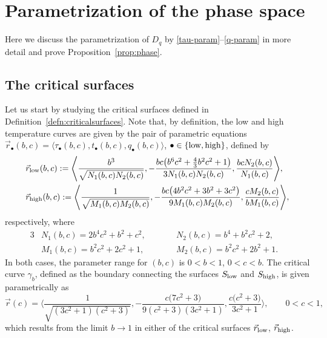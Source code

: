 \documentclass[10pt,a4paper]{amsart}
\numberwithin{equation}{section}
\begin{document}
\section{Parametrization of the phase space} \label{app:param}
Here we discuss the parametrization of $D_q$ by \eqref{tau-param}--\eqref{q-param} in more detail and prove Proposition~\ref{prop:phase}.


\subsection{The critical surfaces}
Let us start by studying the critical surfaces defined in Definition~\ref{defn:criticalsurfaces}.
Note that, by definition, the low and high temperature curves are given by the pair of parametric equations $\vec{r}_{\bullet}(b,c) = \langle \tau_{\bullet}(b,c), t_{\bullet}(b,c), q_{\bullet}(b,c)\rangle$, $\bullet \in \{{\rm low}, {\rm high}\}$, defined by
 \begin{align*}
 &\vec{r}_{{\rm low}}(b,c):= \Biggl\langle \frac{b^3}{\sqrt{N_1(b,c)N_2(b,c)}},-\frac{bc\bigl(b^6c^2 + \frac{4}{3}b^2c^2 + 1\bigr)}{3N_1(b,c)N_2(b,c)},\frac{bcN_2(b,c)}{N_1(b,c)}\Biggr\rangle,\\
 &\vec{r}_{{\rm high}}(b,c):= \Biggl\langle \frac{1}{\sqrt{M_1(b,c)M_2(b,c)}},-\frac{bc\bigl(4b^2c^2 + 3b^2 + 3c^2\bigr)}{9M_1(b,c)M_2(b,c)},\frac{cM_2(b,c)}{bM_1(b,c)}\Biggr\rangle,
 \end{align*}
respectively,
where
 \begin{alignat*}{3}
 &N_1(b,c)=2b^4c^2 + b^2 + c^2, \qquad&& N_2(b,c) = b^4 + b^2c^2 + 2,&\\
 &M_1(b,c)=b^2c^2 + 2c^2 + 1, \qquad&& M_2(b,c) =b^2c^2 + 2b^2 + 1.&
 \end{alignat*}
In both cases, the parameter range for $(b,c)$ is $0 < b < 1$, $0< c < b$. The critical curve $\gamma_b$, defined as the boundary connecting the surfaces $S_{{\rm low}}$ and $S_{{\rm high}}$, is given parametrically as
 \begin{equation*}
 \vec{r}(c) = \Biggl\langle\frac{1}{\sqrt{(3c^2+1)(c^2+3)}},-\frac{c\bigl(7c^2 + 3\bigr)}{9(c^2+3)(3c^2+1)},\frac{c\bigl(c^2 + 3\bigr)}{3c^2+1}\Biggr\rangle, \qquad 0 < c < 1,
 \end{equation*}
 which results from the limit $b\to 1$ in either of the critical surfaces $\vec{r}_{{\rm low}}$, $\vec{r}_{{\rm high}}$.
\end{document}
